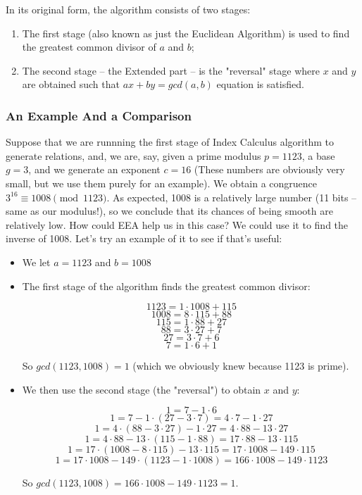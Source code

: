 \documentclass{article}
\begin{document}
        In its original form, the algorithm consists of two stages:
        \begin{enumerate}
          \item The first stage (also known as just the Euclidean Algorithm) is used to find the greatest common divisor of $a$ and $b$;
          \item The second stage -- the Extended part -- is the "reversal" stage where $x$ and $y$ are obtained such that $ax + by = gcd(a,b)$ equation is satisfied.
        \end{enumerate}

        \subsubsection{An Example And a Comparison}

        Suppose that we are runnning the first stage of Index Calculus algorithm to generate relations, and, we are, say, given a prime modulus $p = 1123$, a base $g = 3$, and we generate an exponent $c = 16$ (These numbers are obviously very small, but we use them purely for an example). We obtain a congruence $3^{16} \equiv 1008 \pmod{1123}$. As expected, 1008 is a relatively large number (11 bits -- same as our modulus!), so we conclude that its chances of being smooth are relatively low. How could EEA help us in this case? We could use it to find the inverse of 1008. Let's try an example of it to see if that's useful:

        \begin{itemize}
          \item We let $a = 1123$ and $b = 1008$

          \item The first stage of the algorithm finds the greatest common divisor:

            $$1123 = 1 \cdot 1008 + 115$$
            $$1008 = 8 \cdot 115 + 88$$
            $$115 = 1 \cdot 88 + 27$$
            $$88 = 3 \cdot 27 + 7$$
            $$27 = 3 \cdot 7 + 6$$
            $$7 = 1 \cdot 6 + 1$$

            So $gcd(1123, 1008) = 1$ (which we obviously knew because 1123 is prime).

          \item We then use the second stage (the "reversal") to obtain $x$ and $y$:

            $$1 = 7 - 1 \cdot 6$$
            $$1 = 7 - 1 \cdot (27 - 3 \cdot 7) = 4 \cdot 7 - 1 \cdot 27$$
            $$1 = 4 \cdot (88 - 3 \cdot 27) - 1 \cdot 27 = 4 \cdot 88 - 13 \cdot 27$$
            $$1 = 4 \cdot 88 - 13 \cdot (115 - 1 \cdot 88) = 17 \cdot 88 - 13 \cdot 115$$
            $$1 = 17 \cdot (1008 - 8 \cdot 115) - 13 \cdot 115 = 17 \cdot 1008 - 149 \cdot 115$$
            $$1 = 17 \cdot 1008 - 149 \cdot (1123 - 1 \cdot 1008) = 166 \cdot 1008 - 149 \cdot 1123$$

            So $gcd(1123, 1008) = 166 \cdot 1008 - 149 \cdot 1123 = 1$.

        \end{itemize}
\end{document}
